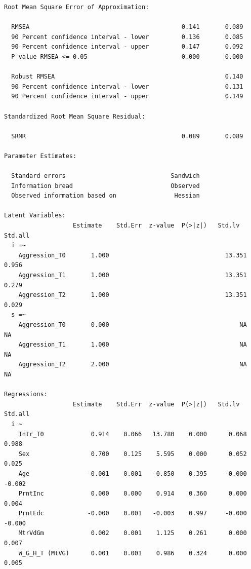 \documentclass{article}
\begin{document}
\begin{verbatim}
Root Mean Square Error of Approximation:

  RMSEA                                          0.141       0.089
  90 Percent confidence interval - lower         0.136       0.085
  90 Percent confidence interval - upper         0.147       0.092
  P-value RMSEA <= 0.05                          0.000       0.000
                                                                  
  Robust RMSEA                                               0.140
  90 Percent confidence interval - lower                     0.131
  90 Percent confidence interval - upper                     0.149

Standardized Root Mean Square Residual:

  SRMR                                           0.089       0.089

Parameter Estimates:

  Standard errors                             Sandwich
  Information bread                           Observed
  Observed information based on                Hessian

Latent Variables:
                   Estimate    Std.Err  z-value  P(>|z|)   Std.lv    Std.all
  i =~                                                                      
    Aggression_T0       1.000                                13.351    0.956
    Aggression_T1       1.000                                13.351    0.279
    Aggression_T2       1.000                                13.351    0.029
  s =~                                                                      
    Aggression_T0       0.000                                    NA       NA
    Aggression_T1       1.000                                    NA       NA
    Aggression_T2       2.000                                    NA       NA

Regressions:
                   Estimate    Std.Err  z-value  P(>|z|)   Std.lv    Std.all
  i ~                                                                       
    Intr_T0             0.914    0.066   13.780    0.000      0.068    0.988
    Sex                 0.700    0.125    5.595    0.000      0.052    0.025
    Age                -0.001    0.001   -0.850    0.395     -0.000   -0.002
    PrntInc             0.000    0.000    0.914    0.360      0.000    0.004
    PrntEdc            -0.000    0.001   -0.003    0.997     -0.000   -0.000
    MtrVdGm             0.002    0.001    1.125    0.261      0.000    0.007
    W_G_H_T (MtVG)      0.001    0.001    0.986    0.324      0.000    0.005


\end{verbatim}
\end{document}
